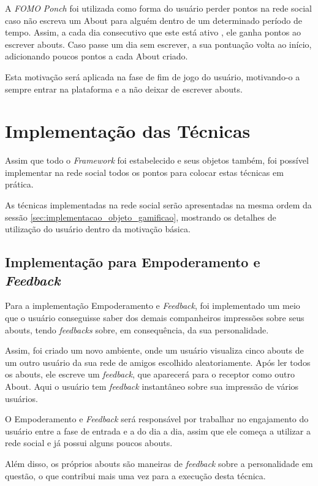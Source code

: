 A \textit{FOMO} \textit{Ponch} foi utilizada como forma do usuário perder pontos na rede social caso não escreva um About para alguém
dentro de um determinado período de tempo. Assim, a cada dia consecutivo que este está ativo
, ele ganha pontos ao escrever abouts. Caso passe um dia sem escrever, a sua pontuação volta ao início, adicionando
poucos pontos a cada About criado.

Esta motivação será aplicada na fase de fim de jogo do usuário, motivando-o a sempre entrar na plataforma
e a não deixar de escrever abouts.

\section{Implementação das Técnicas}
\label{sec:gamifição}
Assim que todo o \textit{Framework} foi estabelecido e seus objetos também, foi possível implementar
na rede social todos os pontos para colocar estas técnicas em prática.

As técnicas implementadas na rede social serão apresentadas na mesma ordem da sessão
\ref{sec:implementacao_objeto_gamificao}, mostrando os detalhes de utilização do usuário dentro
da motivação básica.

\subsection{Implementação para Empoderamento e \textit{Feedback}}
\label{sub:implementacao_empoderamento_feedback}
Para a implementação Empoderamento e \textit{Feedback}, foi implementado um meio que o usuário conseguisse
saber dos demais companheiros impressões sobre seus abouts, tendo \textit{feedbacks} sobre, em consequência,
da sua personalidade. 

Assim, foi criado um novo ambiente, onde um usuário visualiza cinco abouts de um outro usuário
da sua rede de amigos escolhido aleatoriamente. Após ler todos os abouts, ele escreve um \textit{feedback}, 
que aparecerá para o receptor como outro About. Aqui o usuário tem \textit{feedback} instantâneo sobre
sua impressão de vários usuários. 

O Empoderamento e \textit{Feedback}  será responsável por trabalhar no engajamento do usuário entre a
fase de entrada e a do dia a dia, assim que ele começa a utilizar a rede social e já possui
alguns poucos abouts. 

Além disso, os próprios abouts são maneiras de \textit{feedback} sobre a personalidade em questão, o
que contribui mais uma vez para a execução desta técnica.

